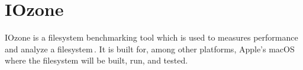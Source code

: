 \section{IOzone}
IOzone is a filesystem benchmarking tool which is used to measures performance and analyze a filesystem\,\cite{IozoneFilesystemBenchmark}. It is built for, among other platforms, Apple's macOS where the filesystem will be built, run, and tested. 